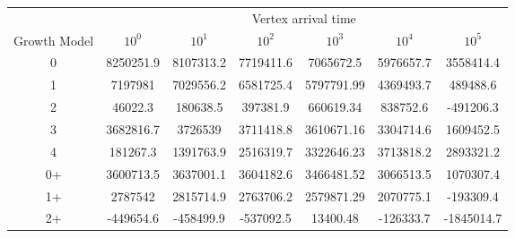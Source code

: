 \begin{table}[H]
\centering
\begin{tabular}{ccccccc}
                                  & \multicolumn{6}{c}{Vertex arrival time}                                                                                                                                     \\
\multicolumn{1}{c|}{Growth Model} & \multicolumn{1}{c}{$10^0$} & \multicolumn{1}{c}{$10^1$} & \multicolumn{1}{c}{$10^2$} & \multicolumn{1}{c}{$10^3$} & \multicolumn{1}{c}{$10^4$} & \multicolumn{1}{c}{$10^5$} \\ \hline
\multicolumn{1}{c|}{0}            & 8250251.9                  & 8107313.2                  & 7719411.6                  & 7065672.5                  & 5976657.7                  & 3558414.4                  \\
\multicolumn{1}{c|}{1}            & 7197981                    & 7029556.2                  & 6581725.4                  & 5797791.99                 & 4369493.7                  & 489488.6                   \\
\multicolumn{1}{c|}{2}            & 46022.3                    & 180638.5                   & 397381.9                   & 660619.34                  & 838752.6                   & -491206.3                  \\
\multicolumn{1}{c|}{3}            & 3682816.7                  & 3726539                    & 3711418.8                  & 3610671.16                 & 3304714.6                  & 1609452.5                  \\
\multicolumn{1}{c|}{4}            & 181267.3                   & 1391763.9                  & 2516319.7                  & 3322646.23                 & 3713818.2                  & 2893321.2                  \\
\multicolumn{1}{c|}{0+}           & 3600713.5                  & 3637001.1                  & 3604182.6                  & 3466481.52                 & 3066513.5                  & 1070307.4                  \\
\multicolumn{1}{c|}{1+}           & 2787542                    & 2815714.9                  & 2763706.2                  & 2579871.29                 & 2070775.1                  & -193309.4                  \\
\multicolumn{1}{c|}{2+}           & -449654.6                  & -458499.9                  & -537092.5                  & 13400.48                   & -126333.7                  & -1845014.7                 \\

\end{tabular}
\end{table}
